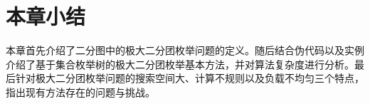 
\section{本章小结}

本章首先介绍了二分图中的极大二分团枚举问题的定义。随后结合伪代码以及实例介绍了基于集合枚举树的极大二分团枚举基本方法，并对算法复杂度进行分析。最后针对极大二分团枚举问题的搜索空间大、计算不规则以及负载不均匀三个特点，指出现有方法存在的问题与挑战。